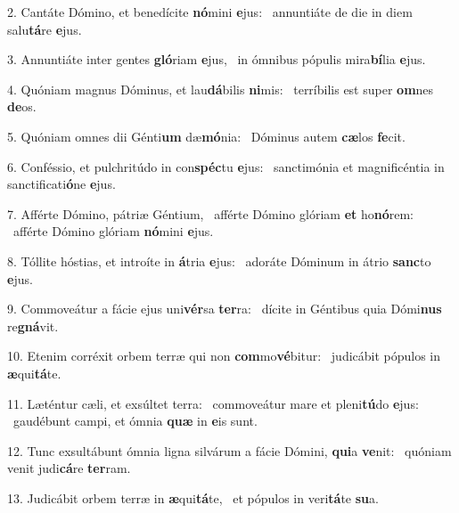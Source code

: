 2. Cantáte Dómino, et benedícite \textbf{nó}mini \textbf{e}jus: \ast\  annuntiáte de die in diem salu\textbf{tá}re \textbf{e}jus.\

3. Annuntiáte inter gentes \textbf{gló}riam \textbf{e}jus, \ast\  in ómnibus pópulis mira\textbf{bí}lia \textbf{e}jus.\

4. Quóniam magnus Dóminus, et lau\textbf{dá}bilis \textbf{ni}mis: \ast\  terríbilis est super \textbf{om}nes \textbf{de}os.\

5. Quóniam omnes dii Génti\textbf{um} dæ\textbf{mó}nia: \ast\  Dóminus autem \textbf{cæ}los \textbf{fe}cit.\

6. Conféssio, et pulchritúdo in con\textbf{spéc}tu \textbf{e}jus: \ast\  sanctimónia et magnificéntia in sanctificati\textbf{ó}ne \textbf{e}jus.\

7. Afférte Dómino, pátriæ Géntium, \dag\  afférte Dómino glóriam \textbf{et} ho\textbf{nó}rem: \ast\  afférte Dómino glóriam \textbf{nó}mini \textbf{e}jus.\

8. Tóllite hóstias, et introíte in \textbf{á}tria \textbf{e}jus: \ast\  adoráte Dóminum in átrio \textbf{sanc}to \textbf{e}jus.\

9. Commoveátur a fácie ejus uni\textbf{vér}sa \textbf{ter}ra: \ast\  dícite in Géntibus quia Dómi\textbf{nus} re\textbf{gná}vit.\

10. Etenim corréxit orbem terræ qui non \textbf{com}mo\textbf{vé}bitur: \ast\  judicábit pópulos in \textbf{æ}qui\textbf{tá}te.\

11. Læténtur cæli, et exsúltet terra: \dag\  commoveátur mare et pleni\textbf{tú}do \textbf{e}jus: \ast\  gaudébunt campi, et ómnia \textbf{quæ} in \textbf{e}is sunt.\

12. Tunc exsultábunt ómnia ligna silvárum a fácie Dómini, \textbf{qui}a \textbf{ve}nit: \ast\  quóniam venit judi\textbf{cá}re \textbf{ter}ram.\

13. Judicábit orbem terræ in \textbf{æ}qui\textbf{tá}te, \ast\  et pópulos in veri\textbf{tá}te \textbf{su}a.\

